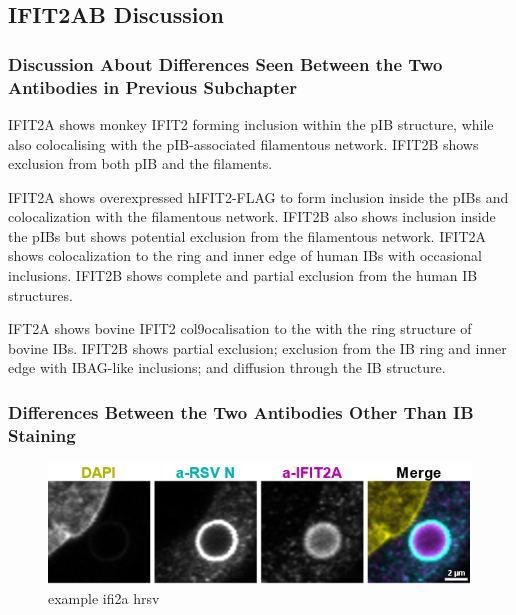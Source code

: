 \subsection{IFIT2AB Discussion}
\subsubsection{Discussion About Differences Seen Between the Two Antibodies in Previous Subchapter} \label{Disuccion sadf}
IFIT2A shows monkey IFIT2 forming inclusion within the pIB structure, while also colocalising with the pIB-associated filamentous network.  IFIT2B shows exclusion from both pIB and the filaments.

IFIT2A shows overexpressed hIFIT2-FLAG to form inclusion inside the pIBs and colocalization with the filamentous network. IFIT2B also shows inclusion inside the pIBs but shows potential exclusion from the filamentous network.
IFIT2A shows colocalization to the ring and inner edge of human IBs with occasional inclusions. IFIT2B shows complete and partial exclusion from the human IB structures. 

IFT2A shows bovine IFIT2 col9ocalisation to the with the ring structure of bovine IBs. IFIT2B shows partial exclusion; exclusion from the IB ring and inner edge with IBAG-like inclusions; and diffusion through the IB structure.
\subsubsection{Differences Between the Two Antibodies Other Than IB Staining} \label{Differences Between the Two Antibodies Other Than IB Staining}
 \label{Human Protein Atlas Show Cytoplasmic Localisation Similar to IFIT2B}

\begin{figure}
    \centering
    \includegraphics[width=1\linewidth]{09. Chapter 4//Figs//01. I2A/04. i2a a549 hrsv n.png}
    \caption[example ifi2a hrsv]{example ifi2a hrsv}
    \label{example ifi2a hrsv}
\end{figure}

